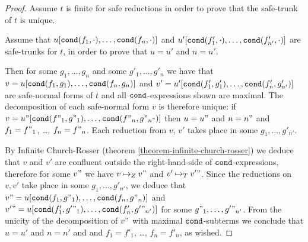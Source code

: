 \begin{proof}
Assume $t$ is finite for safe reductions in order to prove that the safe-trunk of $t$ is unique.

Assume that $u[{\tt cond}(f_1,\cdot), \ldots, {\tt cond}(f_n,\cdot)]$ and
$u'[{\tt cond}(f'_1,\cdot), \ldots, {\tt cond}(f'_{n'},\cdot)]$ are safe-trunks for $t$, in order to prove
that $u=u'$ and $n=n'$. 

Then for some $g_1, \ldots,g_n$ and some $g'_1, \ldots,g'_n$ we have that 
$v = u[{\tt cond}(f_1,g_1), \ldots, {\tt cond}(f_n,g_n)]$ and 
$v' = u'[{\tt cond}(f'_1,g'_1), \ldots, {\tt cond}(f'_n,g'_{n'})]$ 
are safe-normal forms of $t$ and all ${\tt cond}$-expressions shown are maximal. 
The decomposition of each safe-normal form $v$ is therefore unique:
if $v = u"[{\tt cond}(f"_1,g"_1), \ldots, {\tt cond}(f"_n,g"_{n"})]$ then $u=u"$ and $n=n"$
and $f_1=f"_1$, \ldots, $f_n=f"_n$.
Each reduction from $v$, $v'$ takes place in some $g_1, \ldots,g'_{n'}$. 

By Infinite Church-Rosser  
(theorem \ref{theorem-infinite-church-rosser}) we deduce that $v$ and $v'$ are confluent
outside the right-hand-side of ${\tt cond}$-expressions, therefore
for some $v"$ we have $v \mathbin{\mapsto}_Z v"$ and $v' \mathbin{\mapsto}_T v'"$. 
Since the reductions on $v, v'$ take place in some $g_1, \ldots,g'_{n'}$, 
we deduce that $v" = u[{\tt cond}(f_1,g"_1), \ldots, {\tt cond}(f_n,g"_n)]$
and $v'" = u[{\tt cond}(f'_1,g'"_1), \ldots, {\tt cond}(f'_n,g'"_{n'})]$ for some $g"_1, \ldots,g'"_{n'}$.
From the unicity of the decomposition of $v"$
with maximal ${\tt cond}$-subterms we conclude that $u=u'$ and $n=n'$
and and $f_1=f'_1$, \ldots, $f_n=f'_n$, as wished.

\end{proof}


